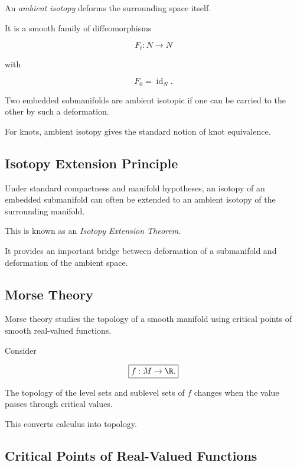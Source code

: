 An \emph{ambient isotopy} deforms the surrounding space itself.

It is a smooth family of diffeomorphisms

\[
\boxed{
F_t:N\to N
}
\]

with

\[
F_0=\operatorname{id}_N.
\]

Two embedded submanifolds are ambient isotopic if one can be carried to the
other by such a deformation.

For knots, ambient isotopy gives the standard notion of knot equivalence.

\subsection{Isotopy Extension Principle}
\label{subsec:isotopy-extension}

Under standard compactness and manifold hypotheses, an isotopy of an
embedded submanifold can often be extended to an ambient isotopy of the
surrounding manifold.

This is known as an \emph{Isotopy Extension Theorem}.

It provides an important bridge between deformation of a submanifold and
deformation of the ambient space.

\subsection{Morse Theory}
\label{subsec:morse-theory-introduction}

Morse theory studies the topology of a smooth manifold using critical points
of smooth real-valued functions.

Consider

\[
\boxed{
f:M\to\R.
}
\]

The topology of the level sets and sublevel sets of \(f\) changes when the
value passes through critical values.

This converts calculus into topology.

\subsection{Critical Points of Real-Valued Functions}
\label{subsec:morse-critical-points}

